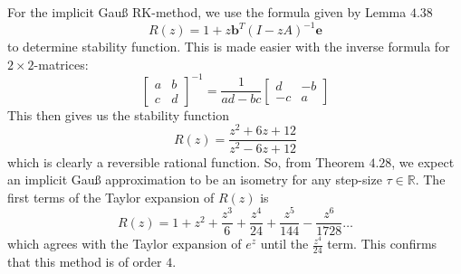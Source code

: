 \documentclass{article}
\theoremstyle{definition}
\begin{document}
\begin{itemize}
		For the implicit Gau{\ss} RK-method, we use the formula given by
		Lemma $4.38$
		\[
			R(z) = 1 + z \mathbf{b}^T(I - zA)^{-1} \mathbf{e}
		\]
		to determine stability function.  This is made easier with the
		inverse formula for $2 \times 2$-matrices:
		\[
			\begin{bmatrix}
				a & b \\
				c & d
			\end{bmatrix}^{-1} =
			\frac{1}{ad - bc}
			\begin{bmatrix}
				d & -b \\
				-c & a
			\end{bmatrix}
		\]
		This then gives us the stability function
		\[
			R(z) = \frac{z^2 + 6z + 12}{z^2 - 6z + 12}
		\]
		which is clearly a reversible rational function.  So, from
		Theorem $4.28$, we expect an
		implicit Gau{\ss} approximation to be an isometry for any
		step-size $\tau \in \mathbb{R}$.
		The first terms of the Taylor expansion of $R(z)$ is
		\[
			R(z) = 1 + z^2 + \frac{z^3}{6} + \frac{z^4}{24} +
				\frac{z^5}{144} - \frac{z^6}{1728} \ldots
		\]
		which agrees with the Taylor expansion of $e^z$ until the
		$\frac{z^4}{24}$ term.  This confirms that this method is of
		order $4$.


\end{itemize}
\end{document}
